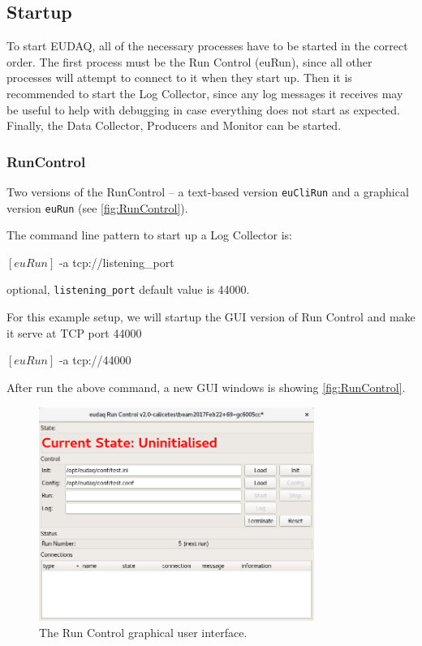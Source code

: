 \subsection{Startup}
To start EUDAQ, all of the necessary processes have to be started in the correct order.
The first process must be the Run Control (euRun),
since all other processes will attempt to connect to it when they start up.
Then it is recommended to start the Log Collector,
since any log messages it receives may be useful
to help with debugging in case everything does not start as expected.
Finally, the Data Collector, Producers and Monitor can be started.

\subsubsection{RunControl}
\label{sec:runcontrol}
Two versions of the RunControl -- a text-based version \texttt{euCliRun} and a graphical version \texttt{euRun} (see \autoref{fig:RunControl}).

The command line pattern to start up a Log Collector is:
\begin{listing}[mybash]
$[euRun]$ -a tcp://{listening_port}
\end{listing}

\begin{description}
optional, \texttt{listening\_port} default value is 44000.
\end{description}

For this example setup, we will startup the GUI version of Run Control and make it serve at TCP port 44000\\
\begin{listing}[mybash]
$[euRun]$ -a tcp://44000
\end{listing}

After run the above command, a new GUI windows is showing \autoref{fig:RunControl}.
\begin{figure}[htb]
  \begin{center}
    \includegraphics[width=0.8\textwidth]{src/images/RunControl}
    \caption{The Run Control graphical user interface.}
    \label{fig:RunControl}
  \end{center}
\end{figure}

